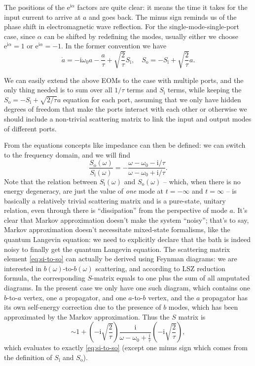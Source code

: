 \documentclass[hyperref, a4paper]{article}
\newcommand*{\ii}{\mathrm{i}}
\newcommand*{\ee}{\mathrm{e}}
\newcommand*{\Si}{S_{\text{i}}}
\newcommand*{\So}{S_{\text{o}}}
\begin{document}
The positions of the $\ee^{\ii \alpha}$ factors are quite clear:
it means the time it takes for the input current to arrive at $a$ and goes back.
The minus sign reminds us of the phase shift in electromagnetic wave reflection.
For the single-mode-single-port case,
since $\alpha$ can be shifted by redefining the modes, 
usually either we choose $\ee^{\ii \alpha} = 1$ or $\ee^{\ii \alpha} = -1$.
In the former convention we have 
\begin{equation}
    \dot{a} = - \ii \omega_0 a - \frac{a}{\tau} + \sqrt{\frac{2}{\tau}} \Si, \quad 
    \So = - \Si + \sqrt{\frac{2}{\tau}} a. 
\end{equation}

We can easily extend the above EOMs to the case with multiple ports, 
and the only thing needed is to sum over all $1/\tau$ terms and $\Si$ terms, 
while keeping the $\So = - \Si + \sqrt{2/\tau} a$ equation for each port,  
assuming that we only have hidden degrees of freedom that make the ports interact with each other
or otherwise we should include a non-trivial scattering matrix to link the input and output modes of different ports.

From the equations concepts like impedance can then be defined: 
we can switch to the frequency domain, and we will find 
\begin{equation}
    \frac{\So(\omega)}{\Si(\omega)} = - \frac{\omega - \omega_0 - \ii / \tau}{\omega - \omega_0 + \ii / \tau}.
    \label{eq:si-to-so}
\end{equation}
Note that the relation between $\Si(\omega)$ and $\So(\omega)$
-- which, when there is no energy degeneracy, are just the value of \emph{one} mode at $t=-\infty$ and $t=\infty$ -- 
is basically a relatively trivial scattering matrix and is a pure-state, unitary relation,
even through there is ``dissipation'' from the perspective of mode $a$.
It's clear that Markov approximation doesn't make the system ``noisy'';
that's to say, Markov approximation doesn't necessitate mixed-state formalisms, 
like the quantum Langevin equation: 
we need to explicitly declare that the bath is indeed noisy to finally get the quantum Langevin equation. 
The scattering matrix element \eqref{eq:si-to-so} can actually be derived using Feynman diagrams: 
we are interested in $b(\omega)$-to-$b(\omega)$ scattering, 
and according to LSZ reduction formula, 
the corresponding $S$-matrix equals to one plus the sum of all amputated diagrams.
In the present case we only have one such diagram, 
which contains one $b$-to-$a$ vertex, one $a$ propagator, and one $a$-to-$b$ vertex, 
and the $a$ propagator has its own self-energy correction due to the presence of $b$ modes, 
which has been approximated by the Markov approximation.
Thus the $S$ matrix is 
\[
    \sim 1 + \left(-\ii \sqrt{\frac{2}{\tau}}\right) \frac{\ii}{\omega - \omega_0 + \frac{\ii}{\tau}} \left(-\ii \sqrt{\frac{2}{\tau}}\right),
\]
which evaluates to exactly \eqref{eq:si-to-so} 
(except one minus sign which comes from the definition of $\Si$ and $\So$).
\end{document}

